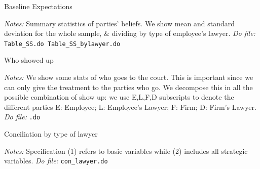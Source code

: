 \documentclass[11pt]{article}
\begin{document}
\begin{table}[H]
    \caption{Baseline Expectations}
    \label{Table_expectations}
    \begin{center}
       \scriptsize{}
    \end{center}
    \footnotesize    
    \textit{Notes:} 
    Summary statistics of parties' beliefs. We show mean and standard deviation for the whole sample, \& dividing by type of employee's lawyer.
    \textit{Do file: } \texttt{Table\_SS.do  Table\_SS\_bylawyer.do}
\end{table}



\begin{table}[H]
    \caption{Who showed up }
    \label{whoshowedup}
    \begin{center}
        \scriptsize{}
    \end{center}
    \footnotesize
    \textit{Notes:} 
We show some stats of who goes to the court. This is important since we can only give the treatment to the parties who go.  We decompose this in all the possible combination of show up: we use E,L,F,D subscripts to denote the different parties E: Employee; L: Employee’s Lawyer;  F: Firm; D: Firm’s Lawyer.
    \textit{Do file: } \texttt{.do}
\end{table}







\begin{table}[H]
    \caption{Conciliation by type of lawyer}
    \label{tab:reg_con_oc}
    \begin{center}
        \scriptsize{}
    \end{center}
    \footnotesize
    \textit{Notes:} 
   Specification (1) refers to basic variables while (2) includes all strategic variables.
    \textit{Do file: } \texttt{con\_lawyer.do}
\end{table} 
\end{document}

